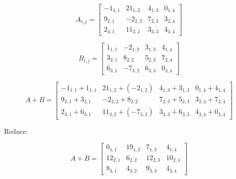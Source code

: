 
\[
\boldsymbol{\mathit{A}}_{i,j} = 
\begin{bmatrix}
    -1_{1,1} & 21_{1,2} & 4_{1,3} & 0_{1,4} \\
    9_{2,1} & -2_{2,2} & 7_{2,3} & 3_{2,4} \\
    2_{3,1} & 11_{3,2} & 3_{3,3} & 4_{3,4}
\end{bmatrix}
\]



\[
\boldsymbol{\mathit{B}}_{i,j} = 
\begin{bmatrix}
    1_{1,1} & -2_{1,2} & 3_{1,3} & 4_{1,4} \\
    3_{2,1} & 8_{2,2} & 5_{2,3} & 7_{2,4} \\
    6_{3,1} & -7_{3,2} & 6_{3,3} & 0_{3,4}
\end{bmatrix}
\]

\[
\boldsymbol{\mathit{A}} + \boldsymbol{\mathit{B}} = 
\begin{bmatrix}
    -1_{1,1} + 1_{1,1} & 21_{1,2} + (-2_{1,2}) & 4_{1,3} + 3_{1,3} & 0_{1,4} + 4_{1,4} \\
    9_{2,1} + 3_{2,1} & -2_{2,2} + 8_{2,2} & 7_{2,3} + 5_{2,3} & 3_{2,4} + 7_{2,4} \\
    2_{3,1} + 6_{3,1} & 11_{3,2} + (-7_{3,2}) & 3_{3,3} + 6_{3,3} & 4_{3,4} + 0_{3,4}
\end{bmatrix}
\]

Reduce:

\[
\boldsymbol{\mathit{A}} + \boldsymbol{\mathit{B}} = 
\begin{bmatrix}
    0_{1,1} & 19_{1,2} & 7_{1,3} & 4_{1,4} \\
    12_{2,1} & 6_{2,2} & 12_{2,3} & 10_{2,4} \\
    8_{3,1} & 4_{3,2} & 9_{3,3} & 4_{3,4}
\end{bmatrix}
\]


